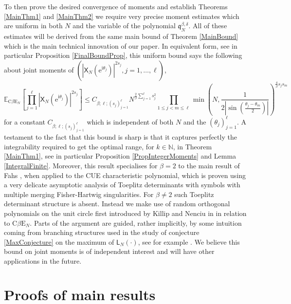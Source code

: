 \documentclass[]{article}
\begin{document}
To then prove the desired convergence of moments and establish Theorems \ref{MainThm1} and \ref{MainThm2} we require very precise moment estimates which are uniform in both $N$ and the variable of the polynomial $\mathfrak{q}_N^{\beta,\delta}$. All of these estimates will be derived from the same main bound of Theorem \ref{MainBound} which is the main technical innovation of our paper.  In equivalent form, see in particular Proposition \ref{FinalBoundProp}, this uniform bound says the following about joint moments of $(|\mathsf{X}_N(\mathrm{e}^{\mathrm{i}\theta_j})|^{2s_j},j=1,\dots,\ell)$,
\begin{equation*}
\mathbb{E}_{\mathrm{C}\beta\mathrm{E}_N}\left[\prod_{j=1}^\ell \left|\mathsf{X}_N\left(\mathrm{e}^{\mathrm{i}\theta_j}\right)\right|^{2s_j}\right]\le C_{\beta;\ell;(s_j)_{j=1}^\ell} N^{\frac{2}{\beta}\sum_{j=1}^\ell s_j^2}\prod_{1\le j<m \le \ell} \min\left(N,\frac{1}{2\left|\sin\left(\frac{\theta_j-\theta_m}{2}\right)\right|}\right)^{\frac{4}{\beta}s_js_m} 
\end{equation*}
for a constant $C_{\beta;\ell;(s_j)_{j=1}^\ell}$ which is independent of both $N$ and the $(\theta_j)_{j=1}^\ell$. A testament to the fact that this bound is sharp is that it captures perfectly the integrability required to get the optimal range, for $k\in \mathbb{N}$, in Theorem \ref{MainThm1}, see in particular Proposition \ref{PropIntegerMoments} and Lemma \ref{IntegralFinite}. Moreover, this result specialises for $\beta=2$ to the main result of Fahs \cite{Fahs}, when applied to the CUE characteristic polynomial, which is proven using a very delicate asymptotic analysis of Toeplitz determinants with symbols with multiple merging Fisher-Hartwig singularities. For $\beta\neq 2$ such Toeplitz determinant structure is absent. Instead we make use of random orthogonal polynomials on the unit circle first introduced by Killip and Nenciu in \cite{KillipNenciu} in relation to $\mathrm{C}\beta\mathrm{E}_N$. Parts of the argument are guided, rather implicitly, by some intuition coming from branching structures used in the study of conjecture \eqref{MaxConjecture} on the maximum of $\mathsf{L}_N(\cdot)$, see for example \cite{ChhaibiMadauleNajnudel}. We believe this bound on joint moments is of independent interest and will have other applications in the future.


\section{Proofs of main results}
\end{document}
